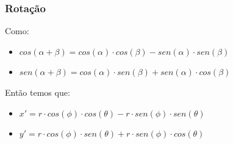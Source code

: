 \documentclass{beamer}
\begin{document}

\begin{frame}
\frametitle{Rotação}

	\begin{block}{Como:}
		\begin{itemize}
			\item $cos(\alpha + \beta) = cos(\alpha) \cdot cos(\beta) - sen(\alpha)\cdot sen(\beta)$
			\item $sen(\alpha + \beta) = cos(\alpha) \cdot sen(\beta)   + sen(\alpha)\cdot cos(\beta)$
		\end{itemize}
	\end{block}

	\begin{block}{Então temos que:}
		\begin{itemize}
			\item $ x' =  r \cdot cos(\phi) \cdot cos(\theta) - r \cdot sen(\phi) \cdot sen(\theta)$
			\item $ y' =  r \cdot cos(\phi) \cdot sen(\theta) + r \cdot sen(\phi) \cdot cos(\theta)$
		\end{itemize}
	\end{block}
	
\end{frame}

\end{document}

